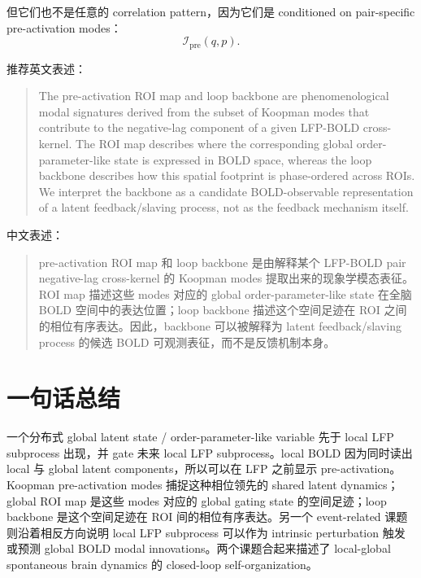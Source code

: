 \documentclass[11pt,a4paper]{ctexart}
\begin{document}
但它们也不是任意的 correlation pattern，因为它们是 conditioned on pair-specific pre-activation modes：
\begin{equation}
    \mathcal I_{\mathrm{pre}}(q,p).
\end{equation}

推荐英文表述：
\begin{quote}
The pre-activation ROI map and loop backbone are phenomenological modal signatures derived from the subset of Koopman modes that contribute to the negative-lag component of a given LFP-BOLD cross-kernel. The ROI map describes where the corresponding global order-parameter-like state is expressed in BOLD space, whereas the loop backbone describes how this spatial footprint is phase-ordered across ROIs. We interpret the backbone as a candidate BOLD-observable representation of a latent feedback/slaving process, not as the feedback mechanism itself.
\end{quote}

中文表述：
\begin{quote}
pre-activation ROI map 和 loop backbone 是由解释某个 LFP-BOLD pair negative-lag cross-kernel 的 Koopman modes 提取出来的现象学模态表征。ROI map 描述这些 modes 对应的 global order-parameter-like state 在全脑 BOLD 空间中的表达位置；loop backbone 描述这个空间足迹在 ROI 之间的相位有序表达。因此，backbone 可以被解释为 latent feedback/slaving process 的候选 BOLD 可观测表征，而不是反馈机制本身。
\end{quote}

\section{一句话总结}

一个分布式 global latent state / order-parameter-like variable 先于 local LFP subprocess 出现，并 gate 未来 local LFP subprocess。local BOLD 因为同时读出 local 与 global latent components，所以可以在 LFP 之前显示 pre-activation。Koopman pre-activation modes 捕捉这种相位领先的 shared latent dynamics；global ROI map 是这些 modes 对应的 global gating state 的空间足迹；loop backbone 是这个空间足迹在 ROI 间的相位有序表达。另一个 event-related 课题则沿着相反方向说明 local LFP subprocess 可以作为 intrinsic perturbation 触发或预测 global BOLD modal innovations。两个课题合起来描述了 local-global spontaneous brain dynamics 的 closed-loop self-organization。
\end{document}
